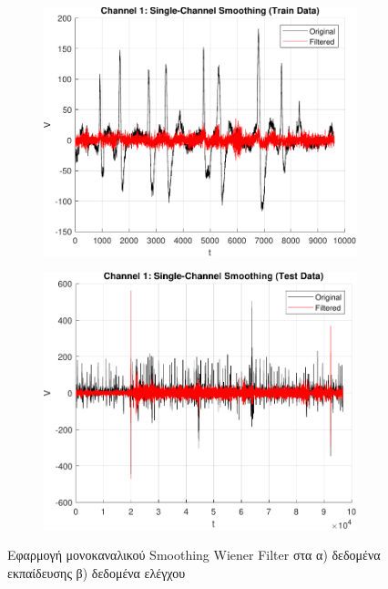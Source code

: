 \documentclass[a4paper,12pt]{article}
\begin{document}
\begin{figure}[htbp]
    \centering
    \begin{subfigure}[b]{0.45\textwidth}
        \includegraphics[width=\textwidth]{plot/single_channel_smoothing_train.pdf}
        \caption{}
        \label{fig:single_channel_smoothing_train}
    \end{subfigure}
    \hfill
    \begin{subfigure}[b]{0.45\textwidth}
        \includegraphics[width=\textwidth]{plot/single_channel_smoothing_test.pdf}
        \caption{}
        \label{fig:single_channel_smoothing_test}
    \end{subfigure}

    \caption{Εφαρμογή μονοκαναλικού Smoothing Wiener Filter 
    στα α) δεδομένα εκπαίδευσης β) δεδομένα ελέγχου}
    \label{fig:single_channel_smoothing}
\end{figure}
\end{document}
